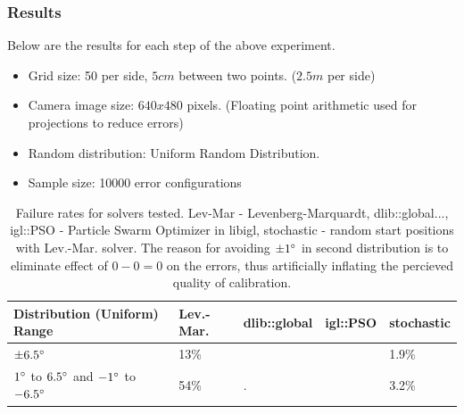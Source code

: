 \documentclass[english, printversion, nomenclature, notitle]{tuvisionthesis} %
\begin{document}
\subsubsection{Results}

Below are the results for each step of the above experiment.

\begin{itemize}
	\item Grid size: 50 per side, $5cm$ between two points. ($2.5m$ per side)
	\item Camera image size: $640 x 480$ pixels. (Floating point arithmetic used for projections to reduce errors)
	\item Random distribution: Uniform Random Distribution.
	\item Sample size: 10000 error configurations
\end{itemize}

\begin{table}[]
	\begin{tabular}{|l|l|l|l|l|}
		\hline
	Distribution (Uniform) Range & Lev.-Mar.  & dlib::global & igl::PSO & stochastic \\
	\hline
	$\pm6.5\degree$& 13\% &  &  & 1.9\% \\
	$1\degree$ to $6.5\degree$ and $-1\degree$ to $-6.5\degree$	& 54\% & . &  &3.2\% \\ \hline

	\end{tabular}
\caption{Failure rates for solvers tested. Lev-Mar - Levenberg-Marquardt, dlib::global..., igl::PSO - Particle Swarm Optimizer in libigl, stochastic - random start positions with Lev.-Mar. solver. The reason for avoiding $\pm1\degree$ in second distribution is to eliminate effect of $0 - 0 = 0$ on the errors, thus artificially inflating the percieved quality of calibration.}
\end{table}

\begin{center}
  \noindent{}
\end{center}
\end{document}

